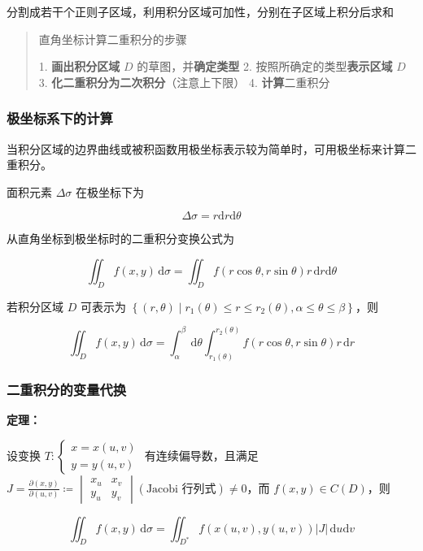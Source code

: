 \documentclass[lang = zh , final , oneside , openany , titlepage , zihao = -4 , linespread = 1.3 , baselineskip = false , cjk-font = windows , text-font = newtx , math-font = newtx]{sjtureport}
\begin{document}
分割成若干个正则子区域，利用积分区域可加性，分别在子区域上积分后求和

\begin{quote}
直角坐标计算二重积分的步骤

1. \textbf{画出积分区域} \(D\) 的草图，并\textbf{确定类型}
2. 按照所确定的类型\textbf{表示区域} \(D\)
3. \textbf{化二重积分为二次积分}（注意上下限）
4. \textbf{计算}二重积分
\end{quote}

\subsubsection{极坐标系下的计算}

当积分区域的边界曲线或被积函数用极坐标表示较为简单时，可用极坐标来计算二重积分。

面积元素 \(\Delta \sigma\) 在极坐标下为

\[
\boxed{\Delta\sigma = r\mathrm{d}r\mathrm{d}\theta}
\]

从直角坐标到极坐标时的二重积分变换公式为

\[
\iint_D f(x,y)\,\mathrm{d}\sigma = \iint_D f(r\cos\theta,r\sin\theta)r\,\mathrm{d}r\mathrm{d}\theta
\]

若积分区域 \(D\) 可表示为 \(\left\{(r,\theta)\mid r_1(\theta)\leq r \leq r_2(\theta), \alpha \leq \theta \leq \beta \right\}\)，则

\[
\iint_D f(x,y)\,\mathrm{d}\sigma = \int_\alpha^\beta\, \mathrm{d}\theta\int_{r_1(\theta)}^{r_2(\theta)} f(r\cos\theta,r\sin\theta)r\,\mathrm{d}r
\]

\subsubsection{二重积分的变量代换}

\textbf{定理：}

设变换 \(T :\begin{cases}x = x(u,v)\\y = y(u,v)\end{cases}\) 有连续偏导数，且满足 \(J = \frac{\partial (x,y)}{\partial (u,v)}\coloneqq \begin{vmatrix}x_u & x_v\\ y_u & y_v\end{vmatrix} \left(\text{Jacobi 行列式}\right)\neq 0\)，而 \(f(x,y)\in C(D)\)，则

\[
\iint_D f(x,y)\,\mathrm{d}\sigma = \iint_{D^*} f(x(u,v),y(u,v))\left\vert J \right\vert \,\mathrm{d}u\mathrm{d}v
\]
\end{document}
